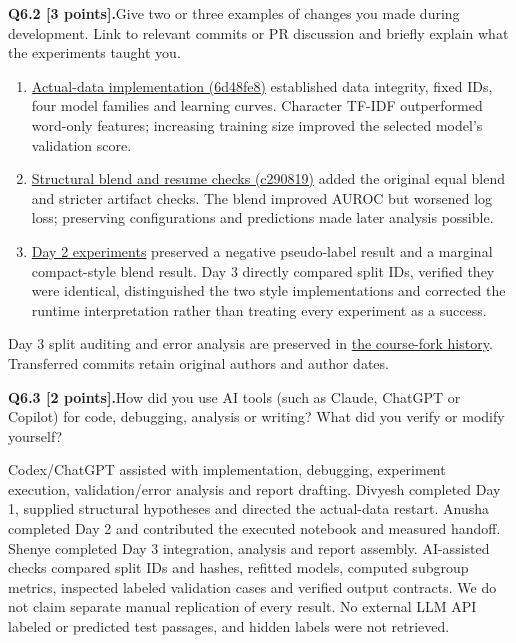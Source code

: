 \documentclass[11pt,letterpaper]{article}
\newcommand{\question}[2]{\needspace{4\baselineskip}\par\addvspace{0.45em}\noindent\textbf{#1}\quad #2\par\nobreak\vspace{0.1em}}
\begin{document}
\question{Q6.2 [3 points].}{Give two or three examples of changes you made during development. Link to relevant commits or PR discussion and briefly explain what the experiments taught you.}

\begin{enumerate}
\item \href{https://github.com/Divyesh-Thirukonda/human-or-ai-submissions/commit/6d48fe887a7bd20ab3bea83d3a895ffd7383dca4}{Actual-data implementation (6d48fe8)} established data integrity, fixed IDs, four model families and learning curves. Character TF-IDF outperformed word-only features; increasing training size improved the selected model's validation score.
\item \href{https://github.com/Divyesh-Thirukonda/human-or-ai-submissions/commit/c290819a0af34dbf88aa0fb30bf97c2bca39ff72}{Structural blend and resume checks (c290819)} added the original equal blend and stricter artifact checks. The blend improved AUROC but worsened log loss; preserving configurations and predictions made later analysis possible.
\item \href{https://github.com/Divyesh-Thirukonda/human-or-ai-submissions/commit/4545a27a44c33d6b1890244b2f08d65b9f82ff99}{Day 2 experiments} preserved a negative pseudo-label result and a marginal compact-style blend result. Day 3 directly compared split IDs, verified they were identical, distinguished the two style implementations and corrected the runtime interpretation rather than treating every experiment as a success.
\end{enumerate}
Day 3 split auditing and error analysis are preserved in \href{https://github.com/Divyesh-Thirukonda/human-or-ai-submissions/commit/cefec50b94ca9352a6ff2881d89dfce05485aaff}{the course-fork history}. Transferred commits retain original authors and author dates.

\question{Q6.3 [2 points].}{How did you use AI tools (such as Claude, ChatGPT or Copilot) for code, debugging, analysis or writing? What did you verify or modify yourself?}

Codex/ChatGPT assisted with implementation, debugging, experiment execution, validation/error analysis and report drafting. Divyesh completed Day 1, supplied structural hypotheses and directed the actual-data restart. Anusha completed Day 2 and contributed the executed notebook and measured handoff. Shenye completed Day 3 integration, analysis and report assembly. AI-assisted checks compared split IDs and hashes, refitted models, computed subgroup metrics, inspected labeled validation cases and verified output contracts. We do not claim separate manual replication of every result. No external LLM API labeled or predicted test passages, and hidden labels were not retrieved.
\end{document}
